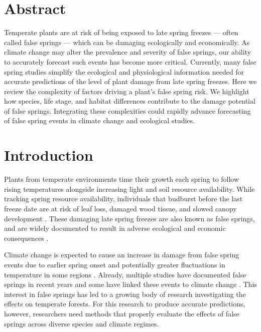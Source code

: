 \documentclass{article}\usepackage[]{graphicx}\usepackage[]{color}
\begin{document}
\section*{Abstract}
Temperate plants are at risk of being exposed to late spring freezes --- often called false springs --- which can be damaging ecologically and economically. As climate change may alter the prevalence and severity of false springs, our ability to accurately forecast such events has become more critical. Currently, many false spring studies simplify the ecological and physiological information needed for accurate predictions of the level of plant damage from late spring freezes. Here we review the complexity of factors driving a plant's false spring risk. We highlight how species, life stage, and habitat differences contribute to the damage potential of false springs. %
Integrating these complexities could rapidly advance forecasting of false spring events in climate change and ecological studies.

\section*{Introduction}

Plants from temperate environments time their growth each spring to follow rising temperatures alongside increasing light and soil resource availability. While tracking spring resource availability, individuals that budburst before the last freeze date are at risk of leaf loss, damaged wood tissue, and slowed canopy development \citep{Gu2008, Hufkens2012}. These damaging late spring freezes are also known as false springs, and are widely documented to result in adverse ecological and economic consequences \citep{Ault2013, Knudson2012}.

Climate change is expected to cause an increase in damage from false spring events due to earlier spring onset and potentially greater fluctuations in temperature in some regions \citep{Inouye2008, Martin2010}. Already, multiple studies have documented false springs in recent years \citep{Augspurger2009, Augspurger2013, Gu2008, Menzel2015} and some have linked these events to climate change \citep{Allstadt2015, Ault2013,  Muffler2016, Vitra2017, Xin2016}. This interest in false springs has led to a growing body of research investigating the effects on temperate forests. For this research to produce accurate predictions, however, researchers need methods that properly evaluate the effects of false springs across diverse species and climate regimes. 
\end{document}

